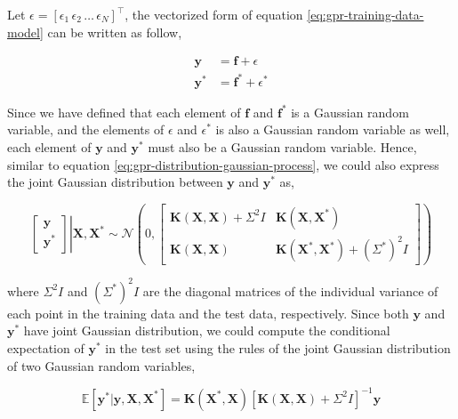 \begin{spacing}{2.0}
    Let $\epsilon = \left[\epsilon_1\,\epsilon_2\,\ldots\,\epsilon_N\right]^{\top}$, the vectorized form of equation \ref{eq:gpr-training-data-model} can
    be written as follow,

    \begin{equation}\begin{aligned}
        \mathbf{y} &= \mathbf{f} + \epsilon \\
        \mathbf{y}^* &= \mathbf{f}^* + \epsilon^*
    \end{aligned}\end{equation}

    Since we have defined that each element of $\mathbf{f}$ and $\mathbf{f}^*$ is a Gaussian random variable, and the elements of $\epsilon$ and $\epsilon^*$
    is also a Gaussian random variable as well, each element of $\mathbf{y}$ and $\mathbf{y}^*$ must also be a Gaussian random variable. Hence, similar to 
    equation \ref{eq:gpr-distribution-gaussian-process}, we could also express the joint Gaussian distribution between $\mathbf{y}$ and $\mathbf{y}^*$ as,

    \begin{equation}
        \left.\begin{bmatrix}
            \mathbf{y} \\ \mathbf{y}^*
        \end{bmatrix}\right|\mathbf{X},\mathbf{X}^* \sim \mathcal{N}\left(0,
            \begin{bmatrix}
                \mathbf{K}(\mathbf{X},\mathbf{X}) + \Sigma^2 I & \mathbf{K}(\mathbf{X},\mathbf{X}^*) \\
                \mathbf{K}(\mathbf{X},\mathbf{X}) & \mathbf{K}(\mathbf{X}^*,\mathbf{X}^*) + (\Sigma^*)^2 I
            \end{bmatrix}
        \right)
        \label{eq:gpr-distribution-gaussian-process-y}
    \end{equation}

    \noindent where $\Sigma^2 I$ and $(\Sigma^*)^2 I$ are the diagonal matrices of the individual variance of each point in the training data and the test data, 
    respectively. Since both $\mathbf{y}$ and $\mathbf{y}^*$ have joint Gaussian distribution, we could compute the conditional expectation of $\mathbf{y}^*$ in 
    the test set using the rules of the joint Gaussian distribution of two Gaussian random variables, 

    \begin{equation}
        \mathbb{E}\left[\mathbf{y}^*|\mathbf{y},\mathbf{X},\mathbf{X}^*\right] = \mathbf{K}(\mathbf{X}^*,\mathbf{X})
            \left[\mathbf{K}(\mathbf{X},\mathbf{X}) + \Sigma^2 I\right]^{-1}\mathbf{y}
    \end{equation}
\end{spacing}
